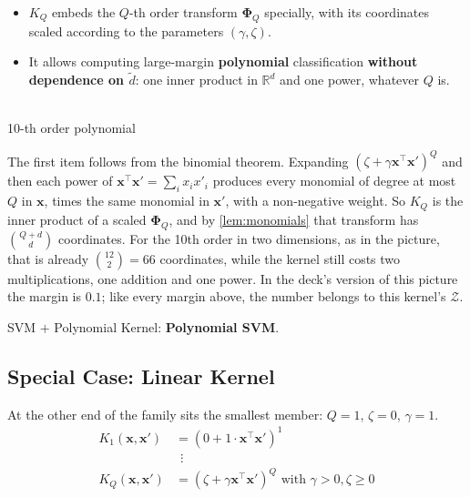 \begin{center}
    \begin{minipage}[c]{0.58\textwidth}
        \begin{itemize}
            \item \(K_Q\) embeds the \(Q\)-th order transform \(\bm{\Phi}_Q\)
                specially, with its coordinates scaled according to the
                parameters \((\gamma, \zeta)\).
            \item It allows computing large-margin \textbf{polynomial}
                classification \textbf{without dependence on \(\tilde{d}\)}:
                one inner product in \(\mathbb{R}^d\) and one power, whatever
                \(Q\) is.
        \end{itemize}
    \end{minipage}%
    \hfill
    \begin{minipage}[c]{0.38\textwidth}
        \centering
        \ksvmpanel[3.4]{\ksvmPolyTen}{\ksvmGaussData}{\ksvmPolyTenSV}\\[2pt]
        {\small 10-th order polynomial}
    \end{minipage}
\end{center}

The first item follows from the binomial theorem. Expanding \((\zeta +
\gamma \bm{x}^\top \bm{x}')^Q\) and then each power of \(\bm{x}^\top \bm{x}'
= \sum_i x_i x'_i\) produces every monomial of degree at most \(Q\) in
\(\bm{x}\), times the same monomial in \(\bm{x}'\), with a non-negative
weight. So \(K_Q\) is the inner product of a scaled \(\bm{\Phi}_Q\), and by
\autoref{lem:monomials} that transform has \(\binom{Q+d}{d}\) coordinates.
For the 10th order in two dimensions, as in the picture, that is already
\(\binom{12}{2} = 66\) coordinates, while the kernel still costs two
multiplications, one addition and one power. In the deck's version of this
picture the margin is \(0.1\); like every margin above, the number belongs to
this kernel's \(\mathcal{Z}\).

\begin{moral}
    SVM \(+\) Polynomial Kernel: \textbf{Polynomial SVM}.
\end{moral}

\subsection{Special Case: Linear Kernel}

At the other end of the family sits the smallest member: \(Q = 1\), \(\zeta
= 0\), \(\gamma = 1\).
\[
    \begin{aligned}
        K_1(\bm{x}, \bm{x}') &= (0 + 1 \cdot \bm{x}^\top \bm{x}')^1\\
        &\ \ \vdots\\
        K_Q(\bm{x}, \bm{x}') &= (\zeta + \gamma \bm{x}^\top \bm{x}')^Q
            \text{ with } \gamma > 0, \zeta \ge 0
    \end{aligned}
\]

